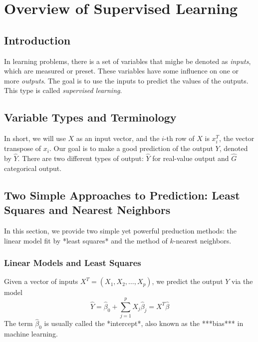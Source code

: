 \section{Overview of Supervised Learning}

\subsection{Introduction}
In learning problems, there is a set of variables that mighe be denoted as \textit{inputs}, which are measured or preset. These variables have some influence on one or more \textit{outputs}. The goal is to use the inputs to predict the values of the outputs. This type is called \textit{supervised learning}.

\subsection{Variable Types and Terminology}
In short, we will use $X$ as an input vector, and the $i$-th row of $X$ is $x_i^T$, the vector transpose of $x_i$. Our goal is to make a good prediction of the output $Y$, denoted by $\hat{Y}$. There are two different types of output: $\hat{Y}$ for real-value output and $\hat{G}$ categorical output.

\subsection{Two Simple Approaches to Prediction: Least Squares and Nearest Neighbors}
In this section, we provide two simple yet powerful preduction methods: the linear model fit by *least squares* and the method of $k$-nearest neighbors.

\subsubsection{Linear Models and Least Squares}
Given a vector of inputs $X^T = (X_1, X_2, \ldots, X_p)$, we predict the output $Y$ via the model
\begin{equation}
	\hat{Y} = \hat{\beta}_0 + \sum_{j=1}^{p}X_j\hat{\beta}_j = X^T\hat{\beta}
\end{equation}
The term $\hat{\beta}_0$ is usually called the *intercept*, also known as the ***bias*** in machine learning.

